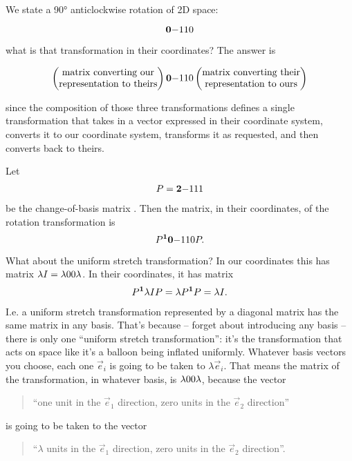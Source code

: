 We state a 90° anticlockwise rotation of 2D space:

$$
\mathbf{0}{-1}
    {1}{0}
$$

what is that transformation in their coordinates? The answer is

$$
\begin{pmatrix}\text{matrix converting our}\\\text{representation to theirs} \\ \end{pmatrix}
\mathbf{0}{-1}
    {1}{0}
\begin{pmatrix}\text{matrix converting their}\\\text{representation to ours} \\ \end{pmatrix}
$$

since the composition of those three transformations defines a single
transformation that takes in a vector expressed in their coordinate system,
converts it to our coordinate system, transforms it as requested, and then
converts back to theirs.

Let
\begin{align*}
  P = \mathbf{2}{-1}
          {1}{1}
\end{align*}
be the change-of-basis matrix . Then the matrix, in their coordinates, of the
rotation transformation is
$$
P^{\mathbf 1}\mathbf{0}{-1}
        {1}{0} P.
$$

What about the uniform stretch transformation? In our coordinates this has
matrix $\lambda I = \mathbf{\lambda}{0}
                        {0}{\lambda}$. In their coordinates, it has matrix
\begin{align*}
P^{\mathbf 1}\lambda I P = \lambda P^{\mathbf 1} P = \lambda I.
\end{align*}
I.e. a uniform stretch transformation represented by a diagonal matrix has the
same matrix in any basis. That's because -- forget about introducing any basis
-- there is only one ``uniform stretch transformation'': it's the
transformation that acts on space like it's a balloon being inflated
uniformly. Whatever basis vectors you choose, each one $\vec e_i$ is going to be taken
to $\lambda \vec e_i$. That means the matrix of the transformation, in whatever basis,
is $\mathbf{\lambda}{0}
        {0}{\lambda}$, because the vector
\begin{quote}
``one unit in the $\vec e_1$ direction, zero units in the $\vec e_2$ direction''
\end{quote}
is going to be taken to the vector
\begin{quote}
``$\lambda$ units in the $\vec e_1$ direction, zero units in the $\vec e_2$ direction''.
\end{quote}

